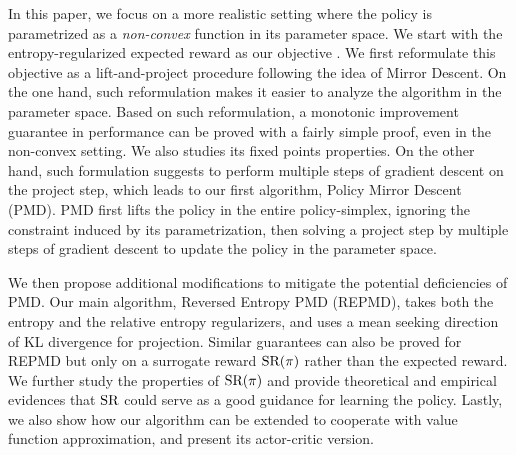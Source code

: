 In this paper, we focus on a more realistic setting where the policy is parametrized as a \emph{non-convex} function in its parameter space. 
We start with the entropy-regularized expected reward as our objective \citep{williams1991function,fox2015taming,schulman2017equivalence,nachum2017bridging,haarnoja2017reinforcement}. 
We first reformulate this objective as a lift-and-project procedure following the idea of Mirror Descent.
On the one hand, such reformulation makes it easier to analyze the algorithm in the parameter space.
Based on such reformulation, a monotonic improvement guarantee in performance can be proved with a fairly simple proof, even in the non-convex setting.
We also studies its fixed points properties.
On the other hand, such formulation suggests to perform multiple steps of gradient descent on the project step, which leads to our first algorithm, Policy Mirror Descent (PMD). 
 PMD first lifts the policy in the entire policy-simplex, ignoring the constraint induced by its parametrization, then solving a project step by multiple steps of gradient descent to update the policy in the parameter space. 

We then propose additional modifications to mitigate the potential deficiencies of PMD.
Our main algorithm, Reversed Entropy PMD (REPMD),  takes both the entropy and the relative entropy regularizers, and uses a mean seeking direction of KL divergence for projection.
Similar guarantees can also be proved for REPMD but only on a surrogate reward $\text{SR}(\pi)$ rather than the expected reward. 
We further study the properties of $\text{SR}(\pi)$ and provide theoretical and empirical evidences that $\text{SR}$ could serve as a good guidance for learning the policy.
Lastly, we also show how our algorithm can be extended to cooperate with value function approximation, and present its  actor-critic version. 



